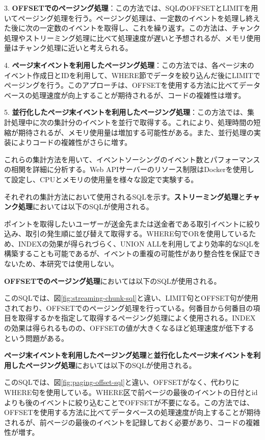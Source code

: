 \documentclass[../../../main]{subfiles}
\begin{document}
    3. \textbf{OFFSETでのページング処理}：この方法では、SQLのOFFSETとLIMITを用いてページング処理を行う。ページング処理は、一定数のイベントを処理し終えた後に次の一定数のイベントを取得し、これを繰り返す。この方法は、チャンク処理やストリーミング処理に比べて処理速度が遅いと予想されるが、メモリ使用量はチャンク処理に近いと考えられる。

    4. \textbf{ページ末イベントを利用したページング処理}：この方法では、各ページ末のイベント作成日とIDを利用して、WHERE節でデータを絞り込んだ後にLIMITでページングを行う。このアプローチは、OFFSETを使用する方法に比べてデータベースの処理速度が向上することが期待されるが、コードの複雑性は増す。

    5. \textbf{並行化したページ末イベントを利用したページング処理}：この方法では、集計処理中に次の集計分のイベントを並行で取得する。これにより、処理時間の短縮が期待されるが、メモリ使用量は増加する可能性がある。また、並行処理の実装によりコードの複雑性がさらに増す。

    これらの集計方法を用いて、イベントソーシングのイベント数とパフォーマンスの相関を詳細に分析する。Web APIサーバーのリソース制限はDockerを使用して設定し、CPUとメモリの使用量を様々な設定で実験する。

    それぞれの集計方法において使用されるSQLを示す。\textbf{ストリーミング処理}と\textbf{チャンク処理}においては以下のSQLが使用される。

    

    ポイントを取得したいユーザーが送金先または送金者である取引イベントに絞り込み、取引の発生順に並び替えて取得する。WHERE句でORを使用しているため、INDEXの効果が得られづらく、UNION ALLを利用してより効率的なSQLを構築することも可能であるが、イベントの重複の可能性があり整合性を保証できないため、本研究では使用しない。

    \textbf{OFFSETでのページング処理}においては以下のSQLが使用される。

    

    このSQLでは、図\ref{fig:streaming-chunk-sql}と違い、LIMIT句とOFFSET句が使用されており、OFFSETでのページング処理を行っている。何番目から何番目の項目を取得するかを指定して取得するページング処理によく使用される。INDEXの効果は得られるものの、OFFSETの値が大きくなるほど処理速度が低下するという問題がある。

    \textbf{ページ末イベントを利用したページング処理}と\textbf{並行化したページ末イベントを利用したページング処理}においては以下のSQLが使用される。

    

    このSQLでは、図\ref{fig:paging-offset-sql}と違い、OFFSETがなく、代わりにWHERE句を使用している。WHERE区で前ページの最後のイベントの日付とidよりも後のイベントに絞り込むことでOFFSETが不要になる。この方法では、OFFSETを使用する方法に比べてデータベースの処理速度が向上することが期待されるが、前ページの最後のイベントを記録しておく必要があり、コードの複雑性が増す。
\end{document}
